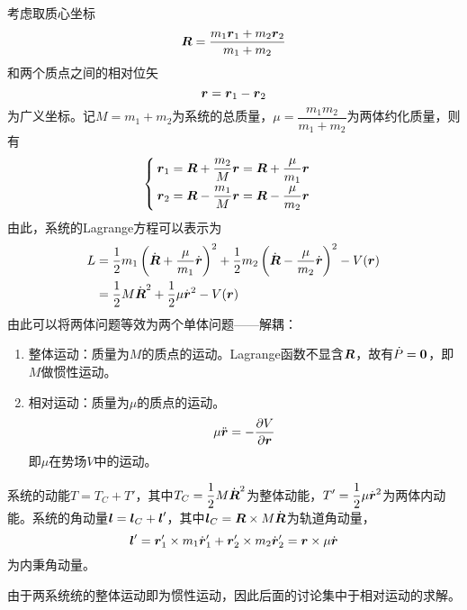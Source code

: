 考虑取质心坐标
\begin{equation}
	\boldsymbol{R} = \frac{m_1\boldsymbol{r}_1+m_2\boldsymbol{r}_2}{m_1+m_2}
\end{equation}
和两个质点之间的相对位矢
\begin{equation}
	\boldsymbol{r} = \boldsymbol{r}_1 - \boldsymbol{r}_2
\end{equation}
为广义坐标。记$M = m_1+m_2$为系统的{\heiti 总质量}，$\mu = \dfrac{m_1m_2}{m_1+m_2}$为两体{\heiti 约化质量}，则有
\begin{equation}
	\begin{cases}
		\displaystyle \boldsymbol{r}_1 = \boldsymbol{R} + \frac{m_2}{M}\boldsymbol{r} = \boldsymbol{R} + \frac{\mu}{m_1} \boldsymbol{r} \\[1.5ex]
		\displaystyle \boldsymbol{r}_2 = \boldsymbol{R} - \frac{m_1}{M}\boldsymbol{r} = \boldsymbol{R} - \frac{\mu}{m_2} \boldsymbol{r}
	\end{cases}
	\label{两体问题广义坐标变换}
\end{equation}
由此，系统的Lagrange方程可以表示为
\begin{align}
	L & = \frac12 m_1 \left(\dot{\boldsymbol{R}}+\frac{\mu}{m_1}\dot{\boldsymbol{r}}\right)^2 + \frac12 m_2 \left(\dot{\boldsymbol{R}}-\frac{\mu}{m_2}\dot{\boldsymbol{r}}\right)^2 - V(\boldsymbol{r}) \nonumber \\
	& = \frac12 M\dot{\boldsymbol{R}}^2 + \frac12 \mu \dot{\boldsymbol{r}}^2 - V(\boldsymbol{r})
\end{align}
由此可以将两体问题等效为两个单体问题——解耦：
\begin{enumerate}
	\item 整体运动：质量为$M$的质点的运动。Lagrange函数不显含$\boldsymbol{R}$，故有$\dot{P} = \boldsymbol{0}$，即$M$做惯性运动。
	\item 相对运动：质量为$\mu$的质点的运动。
	\begin{equation*}
		\mu \ddot{\boldsymbol{r}} = -\frac{\partial V}{\partial \boldsymbol{r}}
	\end{equation*}
	即$\mu$在势场$V$中的运动。
\end{enumerate}
系统的动能$T=T_C+T'$，其中$\displaystyle T_C = \frac12 M\dot{\boldsymbol{R}}^2$为整体动能，$\displaystyle T' = \frac12 \mu\dot{\boldsymbol{r}}^2$为两体内动能。系统的角动量$\boldsymbol{l} = \boldsymbol{l}_C+\boldsymbol{l}'$，其中$\boldsymbol{l}_C = \boldsymbol{R} \times M\dot{\boldsymbol{R}}$为轨道角动量，
\begin{equation*}
	\boldsymbol{l}' = \boldsymbol{r}'_1 \times m_1 \dot{\boldsymbol{r}}'_1 + \boldsymbol{r}'_2 \times m_2 \dot{\boldsymbol{r}}'_2 = \boldsymbol{r} \times \mu \dot{\boldsymbol{r}}
\end{equation*}
为内秉角动量。

由于两系统统的整体运动即为惯性运动，因此后面的讨论集中于相对运动的求解。


